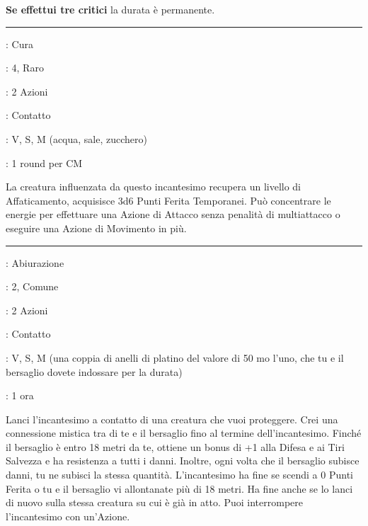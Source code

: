 \begin{multicols}{2}
\textbf{Se effettui tre critici} la durata è permanente.

\smallskip\noindent\rule{\linewidth}{2pt} \hypertarget{Vigore}{}\smallskip{}
\noindent
\begin{description}[noitemsep, topsep=0pt, parsep=0pt, partopsep=0pt, leftmargin=0cm, labelwidth=2.8cm]
	\item[\textbf{Lista di Magia}]: Cura
	\item[\textbf{Livello}]: 4, Raro
	\item[\textbf{T. di Lancio}]: 2 Azioni
	\item[\textbf{Gittata}]: Contatto
	\item[\textbf{Componenti}]: V, S, M (acqua, sale, zucchero)
	\item[\textbf{Durata}]: 1 round per CM
\end{description}

La creatura influenzata da questo incantesimo recupera un livello di Affaticamento, acquisisce 3d6 Punti Ferita Temporanei. Può concentrare le energie per effettuare una Azione di Attacco senza penalità di multiattacco o eseguire una Azione di Movimento in più.

\smallskip\noindent\rule{\linewidth}{2pt} \hypertarget{Vincolo di Interdizione}{}\smallskip{}
\noindent
\begin{description}[noitemsep, topsep=0pt, parsep=0pt, partopsep=0pt, leftmargin=0cm, labelwidth=2.8cm]
	\item[\textbf{Lista di Magia}]: Abiurazione
	\item[\textbf{Livello}]: 2, Comune
	\item[\textbf{T. di Lancio}]: 2 Azioni
	\item[\textbf{Gittata}]: Contatto
	\item[\textbf{Componenti}]: V, S, M (una coppia di anelli di platino del valore di 50 mo l'uno, che tu e il bersaglio dovete indossare per la durata)
	\item[\textbf{Durata}]: 1 ora
\end{description}

Lanci l'incantesimo a contatto di una creatura che vuoi proteggere. Crei una connessione mistica tra di te e il bersaglio fino al termine dell'incantesimo. Finché il bersaglio è entro 18 metri da te, ottiene un bonus di +1 alla Difesa e ai Tiri Salvezza e ha resistenza a tutti i danni. Inoltre, ogni volta che il bersaglio subisce danni, tu ne subisci la stessa quantità. L'incantesimo ha fine se scendi a 0 Punti Ferita o tu e il bersaglio vi allontanate più di 18 metri. Ha fine anche se lo lanci di nuovo sulla stessa creatura su cui è già in atto. Puoi interrompere l'incantesimo con un'Azione.


\end{multicols}
